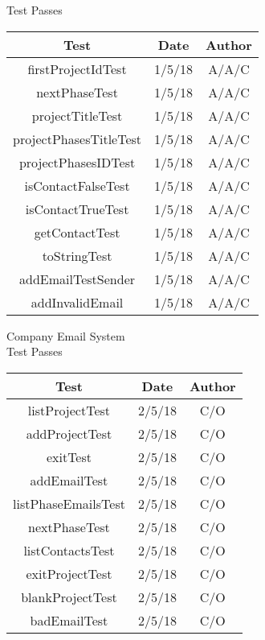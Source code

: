 \documentclass{article}
\begin{document}
\begin{center}
    \vspace{100mm}
    \huge Test Passes \\
    \vspace{5mm}
    \small
    \begin{tabular}{|c|c|c|}
        \hline
        Test & Date & Author \\
        \hline
        firstProjectIdTest & 1/5/18 & A/A/C \\
        \hline
        nextPhaseTest & 1/5/18 & A/A/C \\
        \hline
        projectTitleTest & 1/5/18 & A/A/C \\
        \hline
        projectPhasesTitleTest & 1/5/18 & A/A/C \\
        \hline
        projectPhasesIDTest & 1/5/18 & A/A/C \\
        \hline
        isContactFalseTest & 1/5/18 & A/A/C \\
        \hline
        isContactTrueTest & 1/5/18 & A/A/C\\
        \hline
        getContactTest & 1/5/18 & A/A/C \\
        \hline
        toStringTest & 1/5/18 & A/A/C \\
        \hline
        addEmailTestSender & 1/5/18 & A/A/C \\
        \hline
        addInvalidEmail & 1/5/18 & A/A/C \\
        \hline
    \end{tabular}


    \vspace{100mm}
    \huge Company Email System\\
    \huge Test Passes \\
    \vspace{5mm}
    \small
    \begin{tabular}{|c|c|c|}
        \hline
        Test & Date & Author \\
        \hline
        listProjectTest & 2/5/18 & C/O \\
        \hline
        addProjectTest & 2/5/18 & C/O \\
        \hline
        exitTest & 2/5/18 & C/O \\
        \hline
        addEmailTest & 2/5/18 & C/O \\
        \hline
        listPhaseEmailsTest & 2/5/18 & C/O  \\
        \hline
        nextPhaseTest & 2/5/18 & C/O  \\
        \hline
        listContactsTest & 2/5/18 & C/O \\
        \hline
        exitProjectTest & 2/5/18 & C/O  \\
        \hline
        blankProjectTest & 2/5/18 & C/O  \\
        \hline
        badEmailTest & 2/5/18 & C/O  \\

        \hline
    \end{tabular}




    \end{center}
\end{document}
